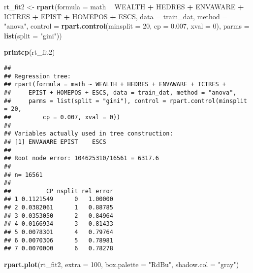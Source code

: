\documentclass[]{book}
\newenvironment{Shaded}{\begin{snugshade}}{\end{snugshade}}
\newcommand{\DataTypeTok}[1]{\textcolor[rgb]{0.13,0.29,0.53}{#1}}
\newcommand{\DecValTok}[1]{\textcolor[rgb]{0.00,0.00,0.81}{#1}}
\newcommand{\FloatTok}[1]{\textcolor[rgb]{0.00,0.00,0.81}{#1}}
\newcommand{\KeywordTok}[1]{\textcolor[rgb]{0.13,0.29,0.53}{\textbf{#1}}}
\newcommand{\NormalTok}[1]{#1}
\newcommand{\OperatorTok}[1]{\textcolor[rgb]{0.81,0.36,0.00}{\textbf{#1}}}
\newcommand{\StringTok}[1]{\textcolor[rgb]{0.31,0.60,0.02}{#1}}
\begin{document}
\begin{Shaded}
\begin{Highlighting}[]
\NormalTok{rt_fit2 <-}\StringTok{ }\KeywordTok{rpart}\NormalTok{(}\DataTypeTok{formula =}\NormalTok{ math }\OperatorTok{~}\StringTok{ }\NormalTok{WEALTH }\OperatorTok{+}\StringTok{ }\NormalTok{HEDRES }\OperatorTok{+}\StringTok{ }\NormalTok{ENVAWARE }\OperatorTok{+}\StringTok{ }
\StringTok{                  }\NormalTok{ICTRES }\OperatorTok{+}\StringTok{ }\NormalTok{EPIST }\OperatorTok{+}\StringTok{ }\NormalTok{HOMEPOS }\OperatorTok{+}\StringTok{ }\NormalTok{ESCS,}
                 \DataTypeTok{data =}\NormalTok{ train_dat,}
                 \DataTypeTok{method =} \StringTok{"anova"}\NormalTok{, }
                 \DataTypeTok{control =} \KeywordTok{rpart.control}\NormalTok{(}\DataTypeTok{minsplit =} \DecValTok{20}\NormalTok{, }
                                         \DataTypeTok{cp =} \FloatTok{0.007}\NormalTok{,}
                                         \DataTypeTok{xval =} \DecValTok{0}\NormalTok{),}
                \DataTypeTok{parms =} \KeywordTok{list}\NormalTok{(}\DataTypeTok{split =} \StringTok{"gini"}\NormalTok{))}

\KeywordTok{printcp}\NormalTok{(rt_fit2)}
\end{Highlighting}
\end{Shaded}

\begin{verbatim}
## 
## Regression tree:
## rpart(formula = math ~ WEALTH + HEDRES + ENVAWARE + ICTRES + 
##     EPIST + HOMEPOS + ESCS, data = train_dat, method = "anova", 
##     parms = list(split = "gini"), control = rpart.control(minsplit = 20, 
##         cp = 0.007, xval = 0))
## 
## Variables actually used in tree construction:
## [1] ENVAWARE EPIST    ESCS    
## 
## Root node error: 104625310/16561 = 6317.6
## 
## n= 16561 
## 
##          CP nsplit rel error
## 1 0.1121549      0   1.00000
## 2 0.0382061      1   0.88785
## 3 0.0353050      2   0.84964
## 4 0.0166934      3   0.81433
## 5 0.0078301      4   0.79764
## 6 0.0070306      5   0.78981
## 7 0.0070000      6   0.78278
\end{verbatim}

\begin{Shaded}
\begin{Highlighting}[]
\KeywordTok{rpart.plot}\NormalTok{(rt_fit2, }\DataTypeTok{extra =} \DecValTok{100}\NormalTok{, }\DataTypeTok{box.palette =} \StringTok{"RdBu"}\NormalTok{, }\DataTypeTok{shadow.col =} \StringTok{"gray"}\NormalTok{)}
\end{Highlighting}
\end{Shaded}
\end{document}
